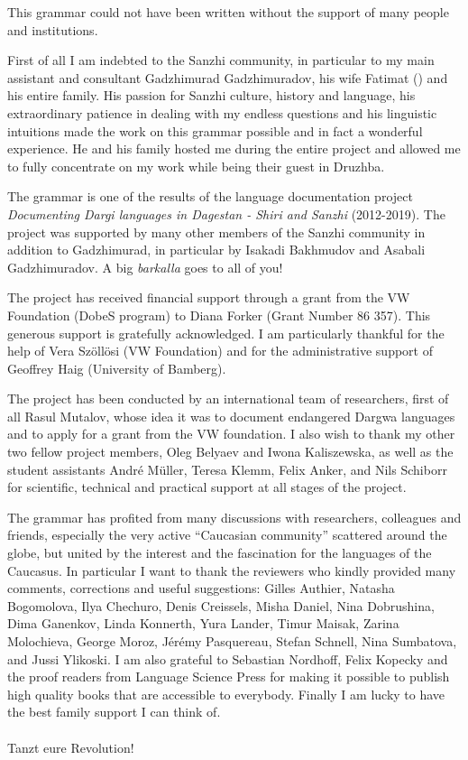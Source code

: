

This grammar could not have been written without the support of many people and institutions.

First of all I am indebted to the Sanzhi community, in particular to my main assistant and consultant Gadzhimurad Gadzhimuradov, his wife Fatimat () and his entire family. His passion for Sanzhi culture, history and language, his extraordinary patience in dealing with my endless questions and his linguistic intuitions made the work on this grammar possible and in fact a wonderful experience. He and his family hosted me during the entire project and allowed me to fully concentrate on my work while being their guest in Druzhba.

The grammar is one of the results of the language documentation project \textit{Documenting Dargi languages in Dagestan - Shiri and Sanzhi} (2012-2019). The project was supported by many other members of the Sanzhi community in addition to Gadzhimurad, in particular by Isakadi Bakhmudov and Asabali Gadzhimuradov. A big \textit{barkalla} goes to all of you!

The project has received financial support through a grant from the VW Foundation (DobeS program) to Diana Forker (Grant Number 86 357). This generous support is gratefully acknowledged. I am particularly thankful for the help of Vera Szöllösi (VW Foundation) and for the administrative support of Geoffrey Haig (University of Bamberg).

The project has been conducted by an international team of researchers, first of all Rasul Mutalov, whose idea it was to document endangered Dargwa languages and to apply for a grant from the VW foundation. I also wish to thank my other two fellow project members, Oleg Belyaev and Iwona Kaliszewska, as well as the student assistants André Müller, Teresa Klemm, Felix Anker, and Nils Schiborr for scientific, technical and practical support at all stages of the project.

The grammar has profited from many discussions with researchers, colleagues and friends, especially the very active ``Caucasian community'' scattered around the globe, but united by the interest and the fascination for the languages of the Caucasus. In particular I want to thank the reviewers who kindly provided many comments, corrections and useful suggestions: Gilles Authier, Natasha Bogomolova, Ilya Chechuro, Denis Creissels, Misha Daniel, Nina Dobrushina, Dima Ganenkov, Linda Konnerth, Yura Lander, Timur Maisak, Zarina Molochieva, George Moroz, Jérémy Pasquereau, Stefan Schnell, Nina Sumbatova, and Jussi Ylikoski. I am also grateful to Sebastian Nordhoff, Felix Kopecky and the proof readers from Language Science Press for making it possible to publish high quality books that are accessible to everybody. Finally I am lucky to have the best family support I can think of.
\\\\
Tanzt eure Revolution!



 



